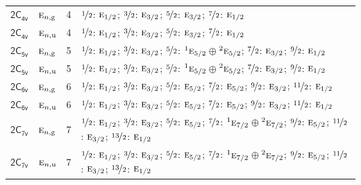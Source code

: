 \documentclass[10pt,a4paper]{article}
\numberwithin{equation}{section}
\newcommand{\grp}[1]{\mathsf{#1}}
\newcommand{\irr}[1]{\text{\normalfont\scshape #1}}
\newcommand{\conjpair}[1]{{}^{#1}}
\newcommand{\ptag}[1]{\mathrm{#1}}
\newlength{\fillwidth}\newlength{\cellwidth}\newlength{\colwidth}
\begin{document}
{\begin{longtable}{@{}llr>{\RaggedRight\arraybackslash}p{\fillwidth}@{}}
\href{2C4v.pdf}{$\grp{2C_{4v}}$} & $\irr{e}_{n,\ptag{g}}$ & 4 & $\nicefrac{1}{2}$: $\irr{e}_{1/2}$; $\nicefrac{3}{2}$: $\irr{e}_{3/2}$; $\nicefrac{5}{2}$: $\irr{e}_{3/2}$; $\nicefrac{7}{2}$: $\irr{e}_{1/2}$\\
\href{2C4v.pdf}{$\grp{2C_{4v}}$} & $\irr{e}_{n,\ptag{u}}$ & 4 & $\nicefrac{1}{2}$: $\irr{e}_{1/2}$; $\nicefrac{3}{2}$: $\irr{e}_{3/2}$; $\nicefrac{5}{2}$: $\irr{e}_{3/2}$; $\nicefrac{7}{2}$: $\irr{e}_{1/2}$\\
\href{2C5v.pdf}{$\grp{2C_{5v}}$} & $\irr{e}_{n,\ptag{g}}$ & 5 & $\nicefrac{1}{2}$: $\irr{e}_{1/2}$; $\nicefrac{3}{2}$: $\irr{e}_{3/2}$; $\nicefrac{5}{2}$: $\conjpair{1}\irr{e}_{5/2}$${}\oplus{}$$\conjpair{2}\irr{e}_{5/2}$; $\nicefrac{7}{2}$: $\irr{e}_{3/2}$; $\nicefrac{9}{2}$: $\irr{e}_{1/2}$\\
\href{2C5v.pdf}{$\grp{2C_{5v}}$} & $\irr{e}_{n,\ptag{u}}$ & 5 & $\nicefrac{1}{2}$: $\irr{e}_{1/2}$; $\nicefrac{3}{2}$: $\irr{e}_{3/2}$; $\nicefrac{5}{2}$: $\conjpair{1}\irr{e}_{5/2}$${}\oplus{}$$\conjpair{2}\irr{e}_{5/2}$; $\nicefrac{7}{2}$: $\irr{e}_{3/2}$; $\nicefrac{9}{2}$: $\irr{e}_{1/2}$\\
\href{2C6v.pdf}{$\grp{2C_{6v}}$} & $\irr{e}_{n,\ptag{g}}$ & 6 & $\nicefrac{1}{2}$: $\irr{e}_{1/2}$; $\nicefrac{3}{2}$: $\irr{e}_{3/2}$; $\nicefrac{5}{2}$: $\irr{e}_{5/2}$; $\nicefrac{7}{2}$: $\irr{e}_{5/2}$; $\nicefrac{9}{2}$: $\irr{e}_{3/2}$; $\nicefrac{11}{2}$: $\irr{e}_{1/2}$\\
\href{2C6v.pdf}{$\grp{2C_{6v}}$} & $\irr{e}_{n,\ptag{u}}$ & 6 & $\nicefrac{1}{2}$: $\irr{e}_{1/2}$; $\nicefrac{3}{2}$: $\irr{e}_{3/2}$; $\nicefrac{5}{2}$: $\irr{e}_{5/2}$; $\nicefrac{7}{2}$: $\irr{e}_{5/2}$; $\nicefrac{9}{2}$: $\irr{e}_{3/2}$; $\nicefrac{11}{2}$: $\irr{e}_{1/2}$\\
\href{2C7v.pdf}{$\grp{2C_{7v}}$} & $\irr{e}_{n,\ptag{g}}$ & 7 & $\nicefrac{1}{2}$: $\irr{e}_{1/2}$; $\nicefrac{3}{2}$: $\irr{e}_{3/2}$; $\nicefrac{5}{2}$: $\irr{e}_{5/2}$; $\nicefrac{7}{2}$: $\conjpair{1}\irr{e}_{7/2}$${}\oplus{}$$\conjpair{2}\irr{e}_{7/2}$; $\nicefrac{9}{2}$: $\irr{e}_{5/2}$; $\nicefrac{11}{2}$: $\irr{e}_{3/2}$; $\nicefrac{13}{2}$: $\irr{e}_{1/2}$\\
\href{2C7v.pdf}{$\grp{2C_{7v}}$} & $\irr{e}_{n,\ptag{u}}$ & 7 & $\nicefrac{1}{2}$: $\irr{e}_{1/2}$; $\nicefrac{3}{2}$: $\irr{e}_{3/2}$; $\nicefrac{5}{2}$: $\irr{e}_{5/2}$; $\nicefrac{7}{2}$: $\conjpair{1}\irr{e}_{7/2}$${}\oplus{}$$\conjpair{2}\irr{e}_{7/2}$; $\nicefrac{9}{2}$: $\irr{e}_{5/2}$; $\nicefrac{11}{2}$: $\irr{e}_{3/2}$; $\nicefrac{13}{2}$: $\irr{e}_{1/2}$\\

\end{longtable}}
\end{document}
